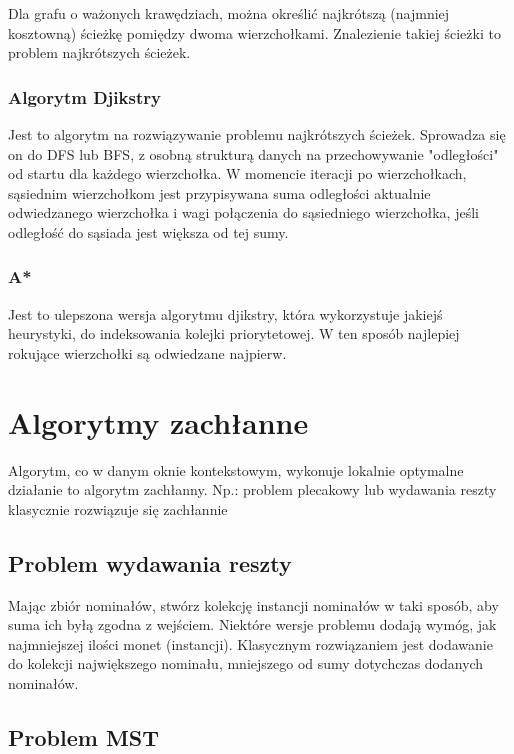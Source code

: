 \documentclass{../notatki}
\begin{document}
Dla grafu o ważonych krawędziach, można określić najkrótszą (najmniej kosztowną)
ścieżkę pomiędzy dwoma wierzchołkami. Znalezienie takiej ścieżki to problem
najkrótszych ścieżek.

\subsubsection{Algorytm Djikstry}

Jest to algorytm na rozwiązywanie problemu najkrótszych ścieżek.
Sprowadza się on
do DFS lub BFS, z osobną strukturą danych na przechowywanie
"odległości" od startu
dla każdego wierzchołka. W momencie iteracji po wierzchołkach,
sąsiednim wierzchołkom
jest przypisywana suma odległości aktualnie odwiedzanego wierzchołka i wagi
połączenia do sąsiedniego wierzchołka, jeśli odległość do sąsiada jest większa
od tej sumy.

\subsubsection{A*}

Jest to ulepszona wersja algorytmu djikstry, która wykorzystuje jakiejś
heurystyki, do indeksowania kolejki priorytetowej. W ten sposób
najlepiej rokujące
wierzchołki są odwiedzane najpierw.

\section{Algorytmy zachłanne}

Algorytm, co w danym oknie kontekstowym, wykonuje lokalnie optymalne działanie
to algorytm zachłanny. Np.: problem plecakowy lub wydawania reszty
klasycznie rozwiązuje się zachłannie

\subsection{Problem wydawania reszty}

Mając zbiór nominałów, stwórz kolekcję instancji nominałów w taki sposób, aby
suma ich byłą zgodna z wejściem. Niektóre wersje problemu dodają wymóg, jak
najmniejszej ilości monet (instancji). Klasycznym rozwiązaniem jest dodawanie
do kolekcji największego nominału, mniejszego od sumy dotychczas
dodanych nominałów.

\subsection{Problem MST}
\end{document}
